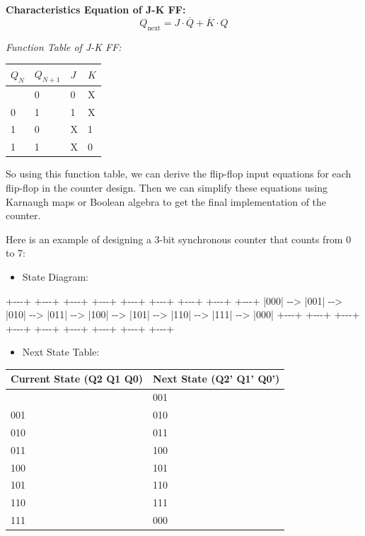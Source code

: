 \documentclass[
  a4paper,
]{article}
\newenvironment{Shaded}{}{}
\newcommand{\NormalTok}[1]{#1}
\providecommand{\tightlist}{%
  \setlength{\itemsep}{0pt}\setlength{\parskip}{0pt}}
\begin{document}
\textbf{Characteristics Equation of J-K FF:}
\[Q_{\text{next}} = J \cdot \overline{Q} + \overline{K} \cdot Q\]

\emph{Function Table of J-K FF:}

\begin{longtable}[]{@{}llll@{}}
\toprule\noalign{}
\(Q_N\) & \(Q_{N+1}\) & \(J\) & \(K\) \\
\midrule\noalign{}
\endhead
\bottomrule\noalign{}
\endlastfoot
0 & 0 & 0 & X \\
0 & 1 & 1 & X \\
1 & 0 & X & 1 \\
1 & 1 & X & 0 \\
\end{longtable}

So using this function table, we can derive the flip-flop input
equations for each flip-flop in the counter design. Then we can simplify
these equations using Karnaugh maps or Boolean algebra to get the final
implementation of the counter.

Here is an example of designing a 3-bit synchronous counter that counts
from 0 to 7:

\begin{itemize}
\tightlist
\item
  State Diagram:
\end{itemize}

\begin{Shaded}
\begin{Highlighting}[]
\NormalTok{        +{-}{-}{-}+     +{-}{-}{-}+     +{-}{-}{-}+     +{-}{-}{-}+     +{-}{-}{-}+     +{-}{-}{-}+     +{-}{-}{-}+     +{-}{-}{-}+     +{-}{-}{-}+}
\NormalTok{        |000| {-}{-}\textgreater{} |001| {-}{-}\textgreater{} |010| {-}{-}\textgreater{} |011| {-}{-}\textgreater{} |100| {-}{-}\textgreater{} |101| {-}{-}\textgreater{} |110| {-}{-}\textgreater{} |111| {-}{-}\textgreater{} |000|}
\NormalTok{        +{-}{-}{-}+     +{-}{-}{-}+     +{-}{-}{-}+     +{-}{-}{-}+     +{-}{-}{-}+     +{-}{-}{-}+     +{-}{-}{-}+     +{-}{-}{-}+     +{-}{-}{-}+}
\end{Highlighting}
\end{Shaded}

\begin{itemize}
\tightlist
\item
  Next State Table:
\end{itemize}

\begin{longtable}[]{@{}ll@{}}
\toprule\noalign{}
Current State (Q2 Q1 Q0) & Next State (Q2' Q1' Q0') \\
\midrule\noalign{}
\endhead
\bottomrule\noalign{}
\endlastfoot
000 & 001 \\
001 & 010 \\
010 & 011 \\
011 & 100 \\
100 & 101 \\
101 & 110 \\
110 & 111 \\
111 & 000 \\
\end{longtable}
\end{document}
